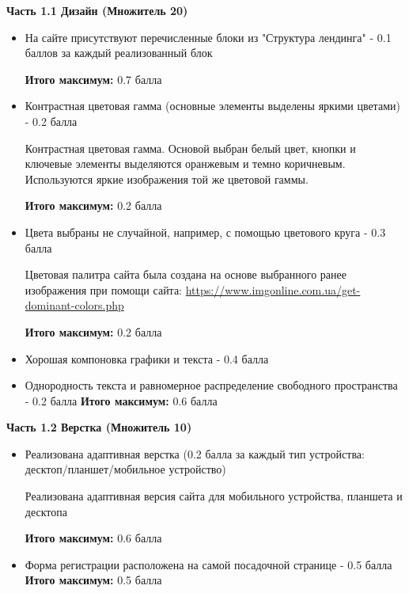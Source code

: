 \solutionSection

\textbf{Часть 1.1 Дизайн (Множитель 20)}

\begin{itemize}
    \item На сайте присутствуют перечисленные блоки из "Структура лендинга" - 0.1 баллов за каждый реализованный блок 

    \textbf{Итого максимум:} 0.7 балла

    \item Контрастная цветовая гамма (основные элементы выделены яркими цветами) - 0.2 балла

    Контрастная цветовая гамма. Основой выбран белый цвет, кнопки и ключевые элементы выделяются оранжевым и темно коричневым. Используются яркие изображения той же цветовой гаммы.


    \textbf{Итого максимум:} 0.2 балла

    \item Цвета выбраны не случайной, например, с помощью цветового круга - 0.3 балла

    Цветовая палитра сайта была создана на основе выбранного ранее изображения при помощи сайта: \url{https://www.imgonline.com.ua/get-dominant-colors.php}

    
    \textbf{Итого максимум:} 0.2 балла

    \item Хорошая компоновка графики и текста - 0.4 балла
    \item Однородность текста и равномерное распределение свободного пространства - 0.2 балла
    \textbf{Итого максимум:} 0.6 балла
\end{itemize}

\textbf{Часть 1.2 Верстка (Множитель 10)}
\begin{itemize}
    \item Реализована адаптивная верстка (0.2 балла за каждый тип устройства: десктоп/планшет/мобильное устройство)

    Реализована адаптивная версия сайта для мобильного устройства, планшета и десктопа 

    \textbf{Итого максимум:} 0.6 балла

    \item Форма регистрации расположена на самой посадочной странице - 0.5 балла
    \textbf{Итого максимум:} 0.5 балла
\end{itemize}

